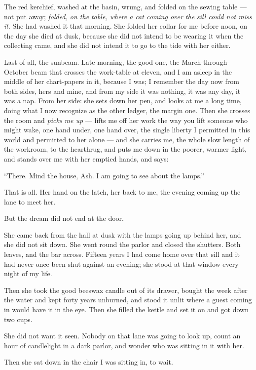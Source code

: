 The red kerchief, washed at the basin, wrung, and folded on the sewing table --- not put away; \emph{folded, on the table, where a cat coming over the sill could not miss it}. She had washed it that morning. She folded her collar for me before noon, on the day she died at dusk, because she did not intend to be wearing it when the collecting came, and she did not intend it to go to the tide with her either.

Last of all, the sunbeam. Late morning, the good one, the March-through-October beam that crosses the work-table at eleven, and I am asleep in the middle of her chart-papers in it, because I was; I remember the day now from both sides, hers and mine, and from my side it was nothing, it was any day, it was a nap. From her side: she sets down her pen, and looks at me a long time, doing what I now recognize as the other ledger, the margin one. Then she crosses the room and \emph{picks me up} --- lifts me off her work the way you lift someone who might wake, one hand under, one hand over, the single liberty I permitted in this world and permitted to her alone --- and she carries me, the whole slow length of the workroom, to the hearthrug, and puts me down in the poorer, warmer light, and stands over me with her emptied hands, and says:

``There. Mind the house, Ash. I am going to see about the lamps.''

That is all. Her hand on the latch, her back to me, the evening coming up the lane to meet her.

But the dream did not end at the door.

She came back from the hall at dusk with the lamps going up behind her, and she did not sit down. She went round the parlor and closed the shutters. Both leaves, and the bar across. Fifteen years I had come home over that sill and it had never once been shut against an evening; she stood at that window every night of my life.

Then she took the good beeswax candle out of its drawer, bought the week after the water and kept forty years unburned, and stood it unlit where a guest coming in would have it in the eye. Then she filled the kettle and set it on and got down two cups.

She did not want it seen. Nobody on that lane was going to look up, count an hour of candlelight in a dark parlor, and wonder who was sitting in it with her.

Then she sat down in the chair I was sitting in, to wait.

